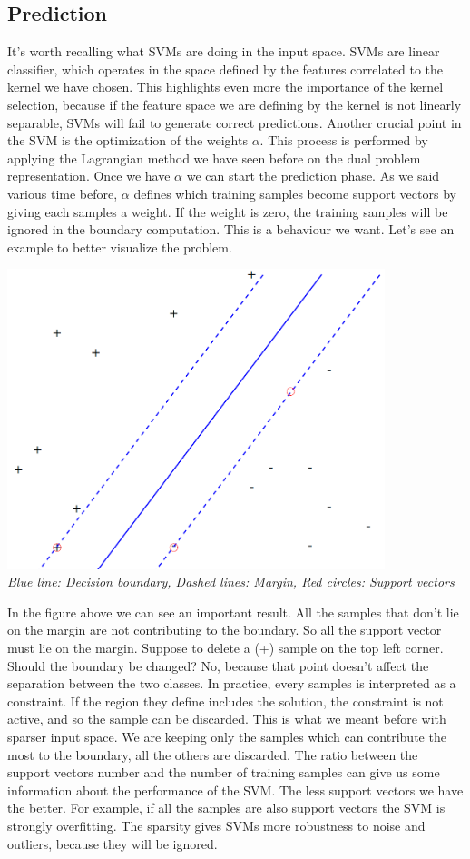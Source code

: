 \documentclass[main.tex]{subfiles}
\begin{document}
\subsection{Prediction} It's worth recalling what SVMs are doing in the input space. SVMs are linear classifier, which operates in the space defined by the features correlated to the kernel we have chosen. This highlights even more the importance of the kernel selection, because if the feature space we are defining by the kernel is not linearly separable, SVMs will fail to generate correct predictions. Another crucial point in the SVM is the optimization of the weights $\alpha$. This process is performed by applying the Lagrangian method we have seen before on the dual problem representation. Once we have $\alpha$ we can start the prediction phase.
As we said various time before, $\alpha$ defines which training samples become support vectors by giving each samples a weight. If the weight is zero, the training samples will be ignored in the boundary computation. This is a behaviour we want. Let's see an example to better visualize the problem.
\begin{center}
    \includegraphics[width=110mm]{img/SVM_Visualization.PNG} \\
    \textit{Blue line: Decision boundary, Dashed lines: Margin, Red circles: Support vectors}
\end{center}
In the figure above we can see an important result. All the samples that don't lie on the margin are not contributing to the boundary. So all the support vector must lie on the margin. Suppose to delete a (+) sample on the top left corner. Should the boundary be changed? No, because that point doesn't affect the separation between the two classes. In practice, every samples is interpreted as a constraint. If the region they define includes the solution, the constraint is not active, and so the sample can be discarded. This is what we meant before with sparser input space. We are keeping only the samples which can contribute the most to the boundary, all the others are discarded. The ratio between the support vectors number and the number of training samples can give us some information about the performance of the SVM. The less support vectors we have the better. For example, if all the samples are also support vectors the SVM is strongly overfitting. The sparsity gives SVMs more robustness to noise and outliers, because they will be ignored.
\end{document}
